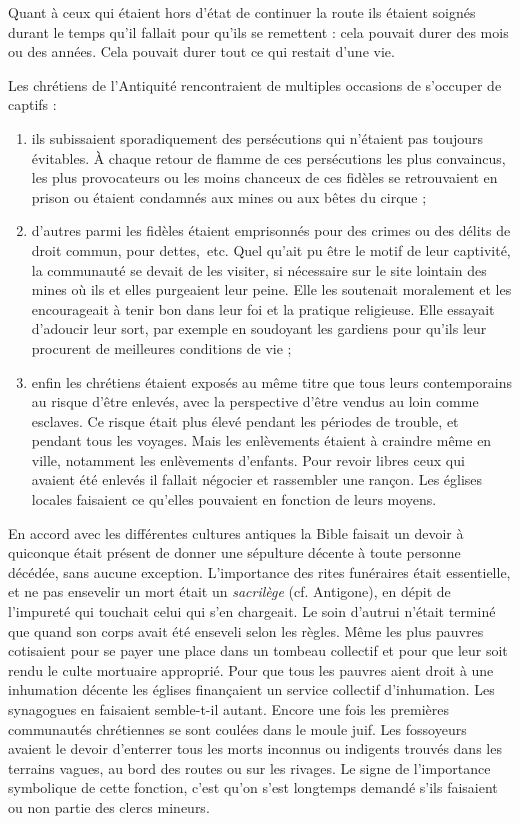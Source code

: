  Quant à ceux qui étaient hors d'état de continuer la route ils étaient soignés durant le temps qu'il fallait pour qu'ils se remettent : cela pouvait durer des mois ou des années. Cela pouvait durer tout ce qui restait d'une vie.



Les chrétiens de l'Antiquité rencontraient de multiples occasions de s'occuper de captifs :
\begin{enumerate}
\item ils subissaient sporadiquement des persécutions qui n'étaient pas toujours évitables. À chaque retour de flamme de ces persécutions les plus convaincus, les plus provocateurs ou les moins chanceux de ces fidèles se retrouvaient en prison ou étaient condamnés aux mines ou aux bêtes du cirque ;
\item d'autres parmi les fidèles étaient emprisonnés pour des crimes ou des délits de droit commun, pour dettes,~etc. Quel qu'ait pu être le motif de leur captivité, la communauté se devait de les visiter, si nécessaire sur le site lointain des mines où ils et elles purgeaient leur peine. Elle les soutenait moralement et les encourageait à tenir bon dans leur foi et la pratique religieuse. Elle essayait d'adoucir leur sort, par exemple en soudoyant les gardiens pour qu'ils leur procurent de meilleures conditions de vie ;
\item enfin les chrétiens étaient exposés au même titre que tous leurs contemporains au risque d'être enlevés, avec la perspective d'être vendus au loin comme esclaves. Ce risque était plus élevé pendant les périodes de trouble, et pendant tous les voyages. Mais les enlèvements étaient à craindre même en ville, notamment les enlèvements d'enfants. Pour revoir libres ceux qui avaient été enlevés il fallait négocier et rassembler une rançon. Les églises locales faisaient ce qu'elles pouvaient en fonction de leurs moyens. 
\end{enumerate}



En accord avec les différentes cultures antiques la Bible faisait un devoir à quiconque était présent de donner une sépulture décente à toute personne décédée, sans aucune exception. L'importance des rites funéraires
 était essentielle, et ne pas ensevelir un mort était un \emph{sacrilège} (cf. Antigone), en dépit de l'impureté qui touchait celui qui s'en chargeait. Le soin d'autrui n'était terminé que quand son corps avait été enseveli selon les règles. Même les plus pauvres cotisaient pour se payer une place dans un tombeau collectif et pour que leur soit rendu le culte mortuaire approprié. 
 Pour que tous les pauvres aient droit à une inhumation décente les églises finançaient un service collectif d'inhumation. Les synagogues en faisaient semble-t-il autant. Encore une fois les premières communautés chrétiennes se sont coulées dans le moule juif. Les fossoyeurs avaient le devoir d'enterrer tous les morts inconnus ou indigents trouvés dans les terrains vagues, au bord des routes ou sur les rivages. Le signe de l'importance symbolique de cette fonction, c'est qu'on s'est longtemps demandé s'ils faisaient ou non partie des clercs mineurs. 



